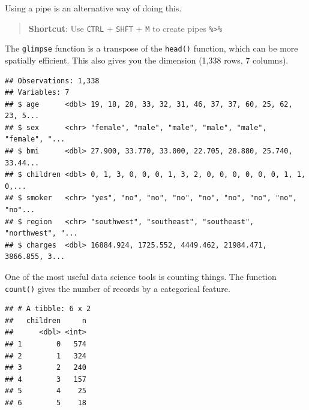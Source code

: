 \documentclass[openany]{book}
\newenvironment{Shaded}{\begin{snugshade}}{\end{snugshade}}
\newcommand{\KeywordTok}[1]{\textcolor[rgb]{0.13,0.29,0.53}{\textbf{#1}}}
\newcommand{\NormalTok}[1]{#1}
\newcommand{\OperatorTok}[1]{\textcolor[rgb]{0.81,0.36,0.00}{\textbf{#1}}}
\newcommand{\StringTok}[1]{\textcolor[rgb]{0.31,0.60,0.02}{#1}}
\begin{document}
Using a pipe is an alternative way of doing this.

\begin{Shaded}
\end{Shaded}

\begin{quote}
\textbf{Shortcut}: Use \texttt{CTRL} + \texttt{SHFT} + \texttt{M} to create pipes \texttt{\%\textgreater{}\%}
\end{quote}

The \texttt{glimpse} function is a transpose of the \texttt{head()} function, which can be more spatially efficient. This also gives you the dimension (1,338 rows, 7 columns).

\begin{Shaded}
\end{Shaded}

\begin{verbatim}
## Observations: 1,338
## Variables: 7
## $ age      <dbl> 19, 18, 28, 33, 32, 31, 46, 37, 37, 60, 25, 62, 23, 5...
## $ sex      <chr> "female", "male", "male", "male", "male", "female", "...
## $ bmi      <dbl> 27.900, 33.770, 33.000, 22.705, 28.880, 25.740, 33.44...
## $ children <dbl> 0, 1, 3, 0, 0, 0, 1, 3, 2, 0, 0, 0, 0, 0, 0, 1, 1, 0,...
## $ smoker   <chr> "yes", "no", "no", "no", "no", "no", "no", "no", "no"...
## $ region   <chr> "southwest", "southeast", "southeast", "northwest", "...
## $ charges  <dbl> 16884.924, 1725.552, 4449.462, 21984.471, 3866.855, 3...
\end{verbatim}

One of the most useful data science tools is counting things. The function \texttt{count()} gives the number of records by a categorical feature.

\begin{Shaded}
\end{Shaded}

\begin{verbatim}
## # A tibble: 6 x 2
##   children     n
##      <dbl> <int>
## 1        0   574
## 2        1   324
## 3        2   240
## 4        3   157
## 5        4    25
## 6        5    18
\end{verbatim}
\end{document}
